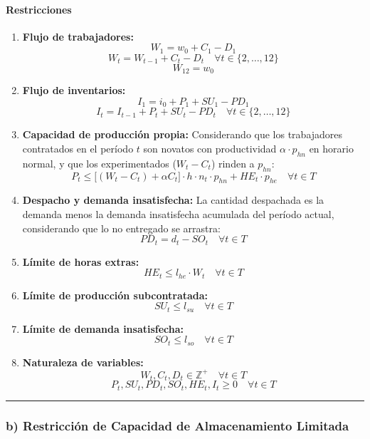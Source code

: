 \documentclass[
]{article}
\begin{document}
\hypertarget{restricciones}{%
\paragraph{Restricciones}\label{restricciones}}

\begin{enumerate}
\def\labelenumi{\arabic{enumi}.}
\item
  \textbf{Flujo de trabajadores:} \[W_1 = w_0 + C_1 - D_1\]
  \[W_t = W_{t-1} + C_t - D_t \quad \forall t \in \{2, \dots, 12\}\]
  \[W_{12} = w_0\]
\item
  \textbf{Flujo de inventarios:} \[I_1 = i_0 + P_1 + SU_1 - PD_1\]
  \[I_t = I_{t-1} + P_t + SU_t - PD_t \quad \forall t \in \{2, \dots, 12\}\]
\item
  \textbf{Capacidad de producción propia:} Considerando que los
  trabajadores contratados en el período \(t\) son novatos con
  productividad \(\alpha \cdot p_{hn}\) en horario normal, y que los
  experimentados (\(W_t - C_t\)) rinden a \(p_{hn}\):
  \[P_t \le \Big[ (W_t - C_t) + \alpha C_t \Big] \cdot h \cdot n_t \cdot p_{hn} + HE_t \cdot p_{he} \quad \forall t \in T\]
\item
  \textbf{Despacho y demanda insatisfecha:} La cantidad despachada es la
  demanda menos la demanda insatisfecha acumulada del período actual,
  considerando que lo no entregado se arrastra:
  \[PD_t = d_t - SO_t \quad \forall t \in T\]
\item
  \textbf{Límite de horas extras:}
  \[HE_t \le l_{he} \cdot W_t \quad \forall t \in T\]
\item
  \textbf{Límite de producción subcontratada:}
  \[SU_t \le l_{su} \quad \forall t \in T\]
\item
  \textbf{Límite de demanda insatisfecha:}
  \[SO_t \le l_{so} \quad \forall t \in T\]
\item
  \textbf{Naturaleza de variables:}
  \[W_t, C_t, D_t \in \mathbb{Z}^+ \quad \forall t \in T\]
  \[P_t, SU_t, PD_t, SO_t, HE_t, I_t \ge 0 \quad \forall t \in T\]
\end{enumerate}

\begin{center}\rule{0.5\linewidth}{0.5pt}\end{center}

\hypertarget{b-restricciuxf3n-de-capacidad-de-almacenamiento-limitada}{%
\subsubsection{b) Restricción de Capacidad de Almacenamiento
Limitada}\label{b-restricciuxf3n-de-capacidad-de-almacenamiento-limitada}}
\end{document}
